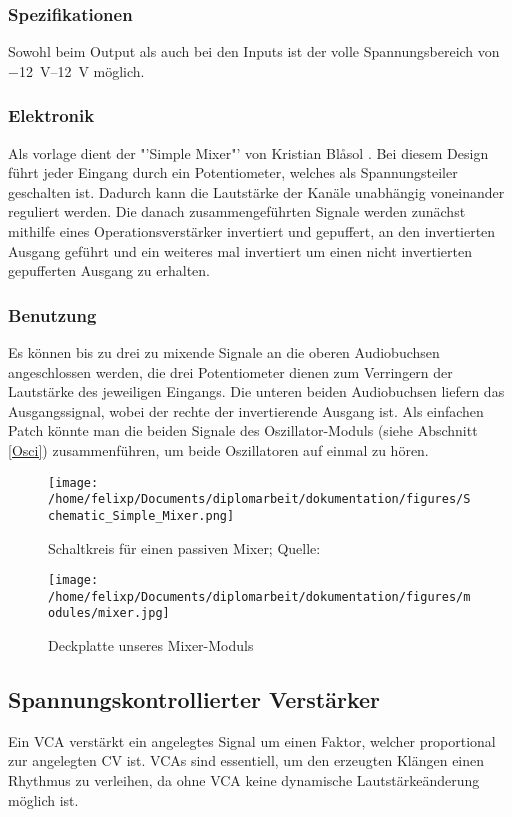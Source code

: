 \subsubsection{Spezifikationen}
\label{sec:org384efe9}
Sowohl beim Output als auch bei den Inputs ist der volle Spannungsbereich von \SIrange{-12}{+12}{\volt} möglich.

\subsubsection{Elektronik}
\label{sec:org2e9ced3}
Als vorlage dient der "'Simple Mixer"' von Kristian Blåsol \cite{miaw:mixer}. Bei diesem Design führt jeder Eingang durch ein Potentiometer, welches als Spannungsteiler geschalten ist. Dadurch kann die Lautstärke der Kanäle unabhängig voneinander reguliert werden. Die danach zusammengeführten Signale werden zunächst mithilfe eines Operationsverstärker invertiert und gepuffert, an den invertierten Ausgang geführt und ein weiteres mal invertiert um einen nicht invertierten gepufferten Ausgang zu erhalten.

\subsubsection{Benutzung}
\label{sec:org3b2a794}
Es können bis zu drei zu mixende Signale an die oberen Audiobuchsen angeschlossen werden, die drei Potentiometer dienen zum Verringern der Lautstärke des jeweiligen Eingangs. Die unteren beiden Audiobuchsen liefern das Ausgangssignal, wobei der rechte der invertierende Ausgang ist. Als einfachen Patch könnte man die beiden Signale des Oszillator-Moduls (siehe Abschnitt \ref{Osci}) zusammenführen, um beide Oszillatoren auf einmal zu hören.

\begin{figure}[hp]
\centering
\texttt{[image: /home/felixp/Documents/diplomarbeit/dokumentation/figures/Schematic\_Simple\_Mixer.png]}
\caption{Schaltkreis für einen passiven Mixer; Quelle: \cite{miaw:mixer}}
\end{figure}

\begin{figure}[hp]
\centering
\texttt{[image: /home/felixp/Documents/diplomarbeit/dokumentation/figures/modules/mixer.jpg]}
\caption{Deckplatte unseres Mixer-Moduls}
\end{figure}
\subsection{Spannungskontrollierter Verstärker \label{VCA}}
\label{sec:org08972be}
Ein \acf{VCA} verstärkt ein angelegtes Signal um einen Faktor, welcher proportional zur angelegten \acl{CV} ist. \acp{VCA} sind essentiell, um den erzeugten Klängen einen Rhythmus zu verleihen, da ohne \ac{VCA} keine dynamische Lautstärkeänderung möglich ist.


